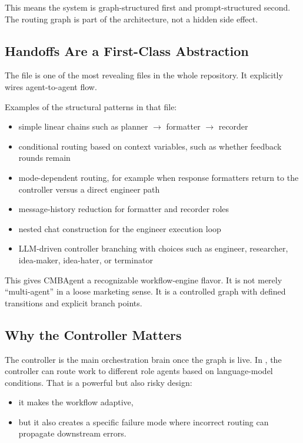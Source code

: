 \documentclass[11pt,a4paper]{article}
\begin{document}
This means the system is graph-structured first and prompt-structured second.
The routing graph is part of the architecture, not a hidden side effect.

\subsection{Handoffs Are a First-Class Abstraction}
The file  is one of the most revealing files in the whole
repository. It explicitly wires agent-to-agent flow.

Examples of the structural patterns in that file:
\begin{itemize}[leftmargin=1.5em]
\item simple linear chains such as planner $\rightarrow$ formatter
$\rightarrow$ recorder
\item conditional routing based on context variables, such as whether feedback
rounds remain
\item mode-dependent routing, for example when response formatters return to the
controller versus a direct engineer path
\item message-history reduction for formatter and recorder roles
\item nested chat construction for the engineer execution loop
\item LLM-driven controller branching with choices such as engineer,
researcher, idea-maker, idea-hater, or terminator
\end{itemize}

This gives CMBAgent a recognizable workflow-engine flavor. It is not merely
``multi-agent'' in a loose marketing sense. It is a controlled graph with
defined transitions and explicit branch points.

\subsection{Why the Controller Matters}
The controller is the main orchestration brain once the graph is live. In
, the controller can route work to different role agents
based on language-model conditions. That is a powerful but also risky design:
\begin{itemize}[leftmargin=1.5em]
\item it makes the workflow adaptive,
\item but it also creates a specific failure mode where incorrect routing can
propagate downstream errors.
\end{itemize}
\end{document}
